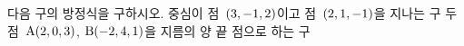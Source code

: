 다음 구의 방정식을 구하시오.
 중심이 점~$(3{,}\mkern3mu\mathopen{}-1{,}\mkern3mu\mathopen{}2)$이고 점~$(2{,}\mkern3mu\mathopen{}1{,}\mkern3mu\mathopen{}-1)$을 지나는 구
 두 점~$\mathrm{A}(2{,}\mkern3mu\mathopen{}0{,}\mkern3mu\mathopen{}3)$, $\mathrm{B}(-2{,}\mkern3mu\mathopen{}4{,}\mkern3mu\mathopen{}1)$을 지름의 양 끝 점으로 하는 구
